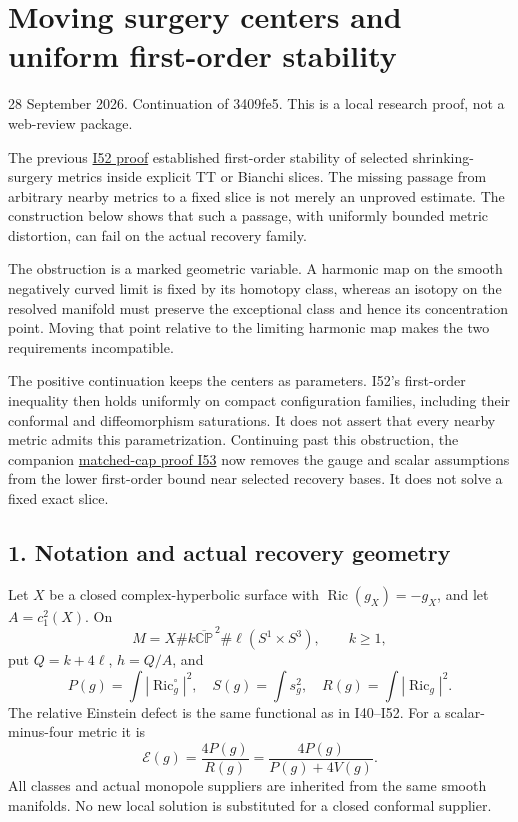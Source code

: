 \documentclass[
  11pt,
]{article}
\author{}
\date{}
\begin{document}
\hypertarget{moving-surgery-centers-and-uniform-first-order-stability}{%
\section{Moving surgery centers and uniform first-order
stability}\label{moving-surgery-centers-and-uniform-first-order-stability}}

28 September 2026. Continuation of 3409fe5. This is a local research
proof, not a web-review package.

The previous
\href{20260927_endpoint_covariance_and_surgery_limits.md}{I52 proof}
established first-order stability of selected shrinking-surgery metrics
inside explicit TT or Bianchi slices. The missing passage from arbitrary
nearby metrics to a fixed slice is not merely an unproved estimate. The
construction below shows that such a passage, with uniformly bounded
metric distortion, can fail on the actual recovery family.

The obstruction is a marked geometric variable. A harmonic map on the
smooth negatively curved limit is fixed by its homotopy class, whereas
an isotopy on the resolved manifold must preserve the exceptional class
and hence its concentration point. Moving that point relative to the
limiting harmonic map makes the two requirements incompatible.

The positive continuation keeps the centers as parameters. I52's
first-order inequality then holds uniformly on compact configuration
families, including their conformal and diffeomorphism saturations. It
does not assert that every nearby metric admits this parametrization.
Continuing past this obstruction, the companion
\href{20260928_intrinsic_caps_and_stability.md}{matched-cap proof I53}
now removes the gauge and scalar assumptions from the lower first-order
bound near selected recovery bases. It does not solve a fixed exact
slice.

\hypertarget{notation-and-actual-recovery-geometry}{%
\subsection{1. Notation and actual recovery
geometry}\label{notation-and-actual-recovery-geometry}}

Let \(X\) be a closed complex-hyperbolic surface with
\(\operatorname{Ric}(g_X)=-g_X\), and let \(A=c_1^2(X)\). On \[
 M=X\# k\overline{\mathbb {CP}}^{\,2}
       \#\ell(S^1\times S^3),\qquad k\ge1,
\] put \(Q=k+4\ell\), \(h=Q/A\), and \[
 P(g)=\int|\operatorname{Ric}^{\circ}_g|^2,\quad
 S(g)=\int s_g^2,\quad R(g)=\int|\operatorname{Ric}_g|^2.
\] The relative Einstein defect is the same functional as in I40--I52.
For a scalar-minus-four metric it is \[
 \mathcal E(g)=\frac{4P(g)}{R(g)}
             =\frac{4P(g)}{P(g)+4V(g)}.                 \tag{1.1}
\] All classes and actual monopole suppliers are inherited from the same
smooth manifolds. No new local solution is substituted for a closed
conformal supplier.
\end{document}
